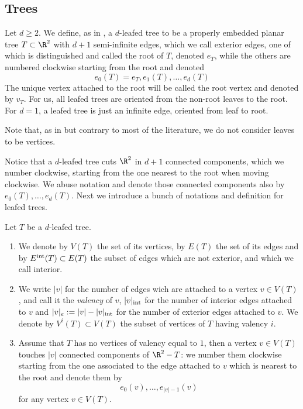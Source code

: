 \subsection{Trees}\label{sectiontrees}

Let $d\geq 2$. We define, as in \cite{Se:book-fukaya-categ}, a $d$-leafed tree to be a properly embedded planar tree $T\subset \R^2$ with $d+1$ semi-infinite edges, which we call exterior edges, one of which is distinguished and called the root of $T$, denoted $e_T$, while the others are numbered clockwise starting from the root and denoted $$e_0(T)=e_T, e_1(T), \ldots,  e_{d}(T)$$ The unique vertex attached to the root will be called the root vertex and denoted by $v_T$. For us, all leafed trees are oriented from the non-root leaves to the root.  For $d=1$, a leafed tree is just an infinite edge, oriented from leaf to root.  \begin{rem}
	Note that, as in 
	\cite{Se:book-fukaya-categ} but contrary to most of the literature, we do not consider leaves to be vertices.
\end{rem}\noindent Notice that a $d$-leafed tree cuts $\R^2$ in $d+1$ connected components, which we number clockwise, starting from the one nearest to the root when moving clockwise. We abuse notation and denote those connected components also by $e_0(T),\ldots,e_{d}(T)$. Next we introduce a bunch of notations and definition for leafed trees. \begin{dfn}\label{hugedegfortrees}
	Let $T$ be a $d$-leafed tree.
	\begin{enumerate}
		\item We denote by $V(T)$ the set of its vertices, by $E(T)$ the set of its edges and by $E^\textnormal{int}(T)\subset E(T)$ the subset of edges which are not exterior, and which we call interior.
		\item We write $|v|$ for the number of edges wich are attached to a vertex $v\in V(T)$, and call it the \textit{valency} of $v$, $|v|_\textnormal{int}$ for the number of interior edges attached to $v$ and $|v|_e:=|v|-|v|_\textnormal{int}$ for the number of exterior edges attached to $v$. We denote by $V^i(T)\subset V(T)$ the subset of vertices of $T$ having valency $i$. 
		\item Assume that $T$ has no vertices of valency equal to $1$, then a vertex $v\in V(T)$ touches $|v|$ connected components of $\R^2-T$: we number them clockwise starting from the one associated to the edge attached to $v$ which is nearest to the root and denote them by $$e_0(v),\ldots,e_{|v|-1}(v)$$ for any vertex $v\in V(T)$.

\end{enumerate}
\end{dfn}
